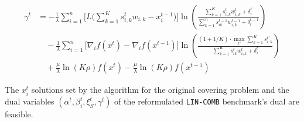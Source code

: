 \begin{align*}
    \gamma^{t} &= -  \frac{1}{\lambda} \sum_{i=1}^{n} \biggl[ L\biggl( \sum_{k=1}^{K} s_{i,k}^{t} w_{i,k}  - x_{i}^{t-1} \biggr) \biggr]  \ln \left( \frac{\sum_{k=1}^{K} s_{i,k}^{t} w_{i,k}^{t} + \delta_{i}^{t}}{\sum_{k=1}^{K}  s_{ik}^{t-1}w_{i,k}^{t-1}  + \delta_{i}^{t-1}} \right) \\
        & \quad - \frac{1}{\lambda} \sum_{i=1}^{n} \biggl[ \nabla_{i} f(x^{t}) - \nabla_{i} f(x^{t-1}) \biggr] \ln \left( \frac{(1 + 1/K) \cdot \max_{t'} \sum_{k=1}^{K} s_{i,k}^{t'}}{\sum_{k=1}^{K}  s_{ik}^{t}w_{i,k}^{t}  + \delta_{i}^{t}} \right)  \\
    & \quad + \frac{\mu}{\lambda} \ln(K\rho) f(x^{t}) - \frac{\mu}{\lambda} \ln(K\rho) f(x^{t-1})
\end{align*}

\begin{lemma} \label{lem:covering-feasibility}
The $x_{i}^{t}$ solutions set by the algorithm for the original covering problem and the dual variables $(\alpha^{t}, \beta_{i}^{t}, \xi_S^t, \gamma^t)$ of the reformulated \texttt{LIN-COMB} benchmark's dual are feasible.
\end{lemma}
%
